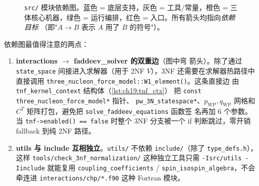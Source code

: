 \begin{figure}[t]
\caption{\texttt{src/} 模块依赖图。蓝色 = 底层支持，灰色 = 工具/常量，橙色 =
三体核心机器，绿色 = 运行编排，红色 = 入口。所有箭头均指向\emph{依赖目标}
（即"$A\to B$ 表示 $A$ 用了 $B$ 的符号"）。}
\label{fig:ch19:dep_graph}
\end{figure}

依赖图最值得注意的两点：

\begin{enumerate}
\item \textbf{interactions $\to$ faddeev\_solver 的双重边}（图中弯
      箭头）。除了通过 \texttt{state\_space} 间接进入求解器（用于 2NF
      $V$），3NF 还需要在求解器热路径中直接调用
      \texttt{three\_nucleon\_force\_model::W1\_element()}。这条直接边
      由 \texttt{tnf\_kernel\_context} 结构体（\cref{lst:ch19:tnf_ctx}）
      把 \texttt{const three\_nucleon\_force\_model*} 指针、
      \texttt{pw\_3N\_statespace*}、$p_{\text{WP}}, q_{\text{WP}}$ 网格和
      $C^{T}$ 矩阵打包，避免把 \texttt{solve\_faddeev\_equations} 函数签
      名再加 6 个参数。当 \texttt{tnf->enabled() == false} 时整个 3NF
      分支被一个 if 判断跳过，零开销 fallback 到纯 2NF 路径。
\item \textbf{utils 与 include 互相独立}。\texttt{utils/} 不依赖
      \texttt{include/}（除了 \texttt{type\_defs.h}），这样
      \texttt{tools/check\_3nf\_normalization/} 这种独立工具只需
      \texttt{-Isrc/utils -Iinclude} 就能复用 \texttt{coupling\_coefficients}
      / \texttt{spin\_isospin\_algebra}，不会牵连进
      \texttt{interactions/chp/*.f90} 这种 Fortran 模块。
\end{enumerate}

